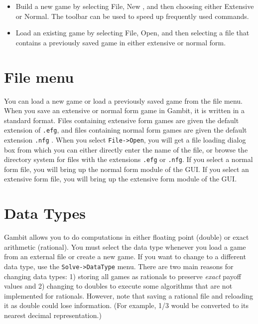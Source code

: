 \begin{itemize}
\item Build a new game by selecting File, New , and then choosing either 
Extensive or Normal.  The toolbar can be used to speed up frequently used
commands. 
\item  Load an existing game by selecting File, Open, and then selecting 
a file that contains a previously saved game in either extensive or normal form.
\end{itemize}


\section{File menu}
You can load a new game or load a previously saved game from the file 
menu.  When you save an extensive or normal form game in Gambit, it is 
written in a standard format.  Files containing extensive form games are
given the default extension of \verb+.efg+, and files containing normal
form games are given the default extension \verb+.nfg+ .  When you select
{\tt File->Open}, you will get a file loading dialog box from which you can
either directly enter the name of the file, or browse the directory system
for files with the extensions \verb+.efg+ or \verb+.nfg+.  If you select a
normal form file, you will bring up the normal form module of the GUI.  If
you select an extensive form file, you will bring up the extensive form
module of the GUI.

\section{Data Types}
Gambit allows you to do computations in either floating point (double) or
exact arithmetic (rational).  You must select the data type whenever you
load a game from an external file or create a new game.  If you want to
change to a different data type, use the {\tt Solve->DataType} menu.  There
are two main reasons for changing data types: 1) storing all games as
rationals to preserve {\em exact} payoff values and 2) changing to doubles
to execute some algorithms that are not implemented for rationals.
However, note that saving a rational file and
reloading it as double could lose information.  (For example, 1/3 would
be converted to its nearest decimal representation.)


